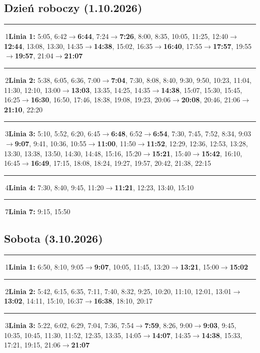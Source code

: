 \documentclass[10pt,a4paper]{article}
\newcommand{\linedot}[1]{\textcolor{#1}{\rule[0.1ex]{0.9ex}{0.9ex}}\,}
\begin{document}
\subsection*{Dzień roboczy (1.10.2026)}
{\footnotesize
\noindent\linedot{L1}1\textbf{Linia 1:} 5:05, 6:42$\to$\textbf{6:44}, 7:24$\to$\textbf{7:26}, 8:00, 8:35, 10:05, 11:25, 12:40$\to$\textbf{12:44}, 13:08, 13:30, 14:35$\to$\textbf{14:38}, 15:02, 16:35$\to$\textbf{16:40}, 17:55$\to$\textbf{17:57}, 19:55$\to$\textbf{19:57}, 21:04$\to$\textbf{21:07}\par\smallskip
\noindent\linedot{L2}2\textbf{Linia 2:} 5:38, 6:05, 6:36, 7:00$\to$\textbf{7:04}, 7:30, 8:08, 8:40, 9:30, 9:50, 10:23, 11:04, 11:30, 12:10, 13:00$\to$\textbf{13:03}, 13:35, 14:25, 14:35$\to$\textbf{14:38}, 15:07, 15:30, 15:45, 16:25$\to$\textbf{16:30}, 16:50, 17:46, 18:38, 19:08, 19:23, 20:06$\to$\textbf{20:08}, 20:46, 21:06$\to$\textbf{21:10}, 22:20\par\smallskip
\noindent\linedot{L3}3\textbf{Linia 3:} 5:10, 5:52, 6:20, 6:45$\to$\textbf{6:48}, 6:52$\to$\textbf{6:54}, 7:30, 7:45, 7:52, 8:34, 9:03$\to$\textbf{9:07}, 9:41, 10:36, 10:55$\to$\textbf{11:00}, 11:50$\to$\textbf{11:52}, 12:29, 12:36, 12:53, 13:28, 13:30, 13:38, 13:50, 14:30, 14:48, 15:16, 15:20$\to$\textbf{15:21}, 15:40$\to$\textbf{15:42}, 16:10, 16:45$\to$\textbf{16:49}, 17:15, 18:08, 18:24, 19:27, 19:57, 20:42, 21:38, 22:15\par\smallskip
\noindent\linedot{L4}4\textbf{Linia 4:} 7:30, 8:40, 9:45, 11:20$\to$\textbf{11:21}, 12:23, 13:40, 15:10\par\smallskip
\noindent\linedot{L7}7\textbf{Linia 7:} 9:15, 15:50\par\smallskip
}
\subsection*{Sobota (3.10.2026)}
{\footnotesize
\noindent\linedot{L1}1\textbf{Linia 1:} 6:50, 8:10, 9:05$\to$\textbf{9:07}, 10:05, 11:45, 13:20$\to$\textbf{13:21}, 15:00$\to$\textbf{15:02}\par\smallskip
\noindent\linedot{L2}2\textbf{Linia 2:} 5:42, 6:15, 6:35, 7:11, 7:40, 8:32, 9:25, 10:20, 11:10, 12:01, 13:01$\to$\textbf{13:02}, 14:11, 15:10, 16:37$\to$\textbf{16:38}, 18:10, 20:17\par\smallskip
\noindent\linedot{L3}3\textbf{Linia 3:} 5:22, 6:02, 6:29, 7:04, 7:36, 7:54$\to$\textbf{7:59}, 8:26, 9:00$\to$\textbf{9:03}, 9:45, 10:35, 10:45, 11:30, 11:52, 12:35, 13:35, 14:05$\to$\textbf{14:07}, 14:35$\to$\textbf{14:38}, 15:33, 17:21, 19:15, 21:06$\to$\textbf{21:07}\par\smallskip
}
\end{document}
